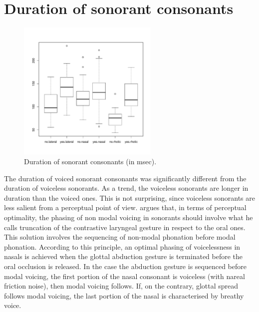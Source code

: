 \documentclass[11pt,a4paper,openany]{memoir}\usepackage[]{graphicx}\usepackage[]{color}
\newenvironment{knitrout}{}{} %
\begin{document}
\section{Duration of sonorant consonants}



\begin{figure}
\centering
\begin{knitrout}
\color{fgcolor}
\includegraphics[width=0.6\textwidth]{img/mann-dur-box-1} 

\end{knitrout}
\caption{Duration of sonorant consonants (in msec).}
\label{f:dur_man}
\end{figure}

The duration of voiced sonorant consonants was significantly different from the duration of voiceless sonorants.
As a trend, the voiceless sonorants are longer in duration than the voiced ones.
This is not surprising, since voiceless sonorants are less salient from a perceptual point of view.
\citet{silverman1997} argues that, in terms of perceptual optimality, the phasing of non modal voicing in sonorants should involve what he calls truncation of the contrastive laryngeal gesture in respect to the oral ones.
This solution involves the sequencing of non-modal phonation before modal phonation.
According to this principle, an optimal phasing of voicelessness in nasals is achieved when the glottal abduction gesture is terminated before the oral occlusion is released.
In the case the abduction gesture is sequenced before modal voicing, the first portion of the nasal consonant is voiceless (with nareal friction noise), then modal voicing follows.
If, on the contrary, glottal spread follows modal voicing, the last portion of the nasal is characterised by breathy voice.
\end{document}
